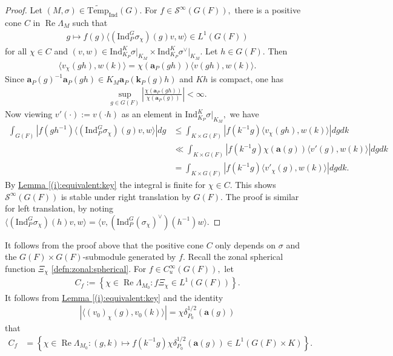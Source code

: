 \documentclass[10pt]{amsart}
\theoremstyle{definition}
\numberwithin{equation}{section}
\numberwithin{equation}{subsection}
\newcommand{\Ind}{\mathrm{Ind}}
\renewcommand{\Re}{\mathop{\mathrm{Re}}}
\begin{document}
\begin{proof}
    Let $(M,\sigma)\in\widetilde{\mathrm{Temp}}_\Ind(G).$ For $f\in \mathcal{S}^\infty(G(F)),$ there is a positive cone $C$ in $\Re\Lambda_M$ such that
    \begin{align*}
        g\mapsto f(g)\langle(\Ind_P^G\sigma_\chi)(g)v,w\rangle \in L^1(G(F))
    \end{align*}
    for all $\chi\in C$ and  $(v,w)\in \Ind_{K_P }^K\sigma\vert_{K_M }\times \Ind_{K_P }^K\sigma^\vee\vert_{K_M }$. 
    Let $h\in G(F).$ Then
    \begin{align*}
        \langle v_\chi(gh),w(k)\rangle=\chi(\mathbf{a}_P(gh))\langle v(gh),w(k)\rangle.
    \end{align*}
    Since $\textbf{a}_P(g)^{-1}\textbf{a}_P(gh)\in K_M\mathbf{a}_P(\mathbf{k}_P(g)h)$ and $Kh$ is compact, one has 
    \begin{align*}
        \sup_{g\in G(F)}\left|\frac{\chi(\mathbf{a}_P(gh))}{\chi(\mathbf{a}_P(g))}\right|<\infty.
    \end{align*}
     Now viewing $v'(\cdot):=v(\cdot h)$ as an element in $\Ind_{K_{P}}^K \sigma|_{K_M},$ we have
    \begin{align*}
        \int_{G(F)} \left|f(gh^{-1})\langle (\Ind_{P}^G \sigma_\chi)(g)v,w\rangle\right| dg&\le \int_{K\times G(F)} \left|f(k^{-1}g)\langle v_\chi(gh),w(k)\rangle\right| dgdk\\
        & \ll \int_{K\times G(F)} \left|f(k^{-1}g)\chi(\mathbf{a}(g))\langle v'(g),w(k)\rangle\right|dgdk\\
        &= \int_{K\times G(F)} \left|f(k^{-1}g)\langle v'_\chi(g),w(k)\rangle\right|dgdk.
    \end{align*}
By \hyperref[(i):equivalent:key]{Lemma \ref{(i):equivalent:key}} the integral is finite for $\chi\in C$. This shows $\mathcal{S}^\infty(G(F))$ is stable under right translation by $G(F)$. The proof is similar for left translation, by noting $\langle(\Ind_P^G\sigma_\chi)(h)v,w\rangle=\langle v,(\Ind_P^G(\sigma_\chi)^\lor)(h^{-1})w\rangle$.
\end{proof}

It follows from the proof above that the positive cone $C$ only depends on $\sigma$ and the $G(F)\times G(F)$-submodule generated by $f$. Recall the zonal spherical function $\Xi_\chi$ \eqref{defn:zonal:spherical}. For $f\in C^\infty_u(G(F)),$ let
\begin{align*}
    C_f:=\left\{\chi \in \Re\Lambda_{M_0}: f\Xi_\chi\in L^1(G(F))\right\}.
\end{align*}
It follows from 
\hyperref[(i):equivalent:key]{Lemma \ref{(i):equivalent:key}} and the identity
    \begin{align*}
       |\langle (v_0)_\chi(g),v_0(k)\rangle|=\chi\delta_{P_0}^{1/2}(\mathbf{a}(g))
    \end{align*}
that
\begin{align*}
        C_f&=\left\{\chi\in \Re\Lambda_{M_0}: (g,k)\mapsto f(k^{-1}g)\chi\delta_{P_0}^{1/2}(\textbf{a}(g)) \in L^1(G(F)\times K)\right\}.
    \end{align*}
\end{document}
